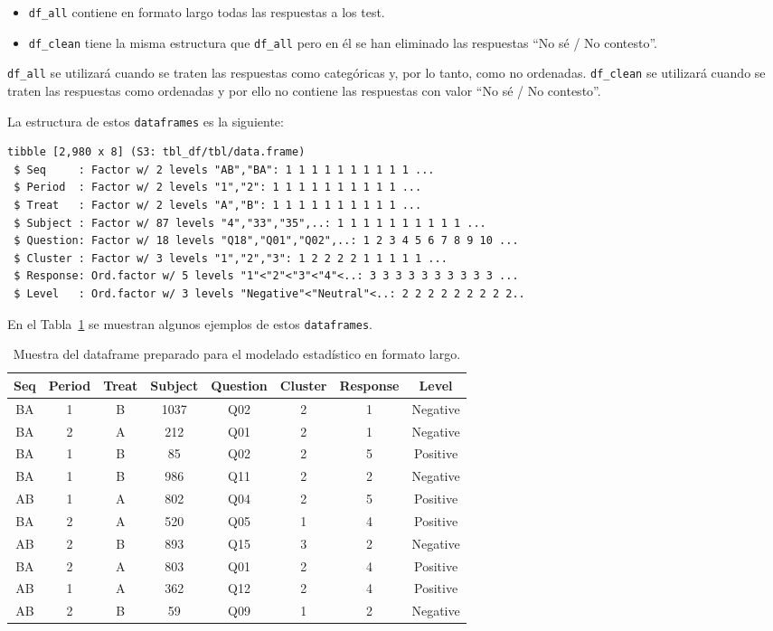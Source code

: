 \documentclass[
  12pt,
  a4paper,
  extrafontsizes,
  onecolumn,
  openright]{memoir}
\providecommand{\tightlist}{%
  \setlength{\itemsep}{0pt}\setlength{\parskip}{0pt}}\usepackage{longtable,booktabs,array}
\begin{document}
\begin{itemize}
\tightlist
\item
  \texttt{df\_all} contiene en formato largo todas las respuestas a los
  test.
\item
  \texttt{df\_clean} tiene la misma estructura que \texttt{df\_all} pero
  en él se han eliminado las respuestas \enquote{No sé / No contesto}.
\end{itemize}

\texttt{df\_all} se utilizará cuando se traten las respuestas como
categóricas y, por lo tanto, como no ordenadas. \texttt{df\_clean} se
utilizará cuando se traten las respuestas como ordenadas y por ello no
contiene las respuestas con valor \enquote{No sé / No contesto}.

La estructura de estos \texttt{dataframes} es la siguiente:

\begin{verbatim}
tibble [2,980 x 8] (S3: tbl_df/tbl/data.frame)
 $ Seq     : Factor w/ 2 levels "AB","BA": 1 1 1 1 1 1 1 1 1 1 ...
 $ Period  : Factor w/ 2 levels "1","2": 1 1 1 1 1 1 1 1 1 1 ...
 $ Treat   : Factor w/ 2 levels "A","B": 1 1 1 1 1 1 1 1 1 1 ...
 $ Subject : Factor w/ 87 levels "4","33","35",..: 1 1 1 1 1 1 1 1 1 1 ...
 $ Question: Factor w/ 18 levels "Q18","Q01","Q02",..: 1 2 3 4 5 6 7 8 9 10 ...
 $ Cluster : Factor w/ 3 levels "1","2","3": 1 2 2 2 2 1 1 1 1 1 ...
 $ Response: Ord.factor w/ 5 levels "1"<"2"<"3"<"4"<..: 3 3 3 3 3 3 3 3 3 3 ...
 $ Level   : Ord.factor w/ 3 levels "Negative"<"Neutral"<..: 2 2 2 2 2 2 2 2 2..
\end{verbatim}

En el Tabla~\ref{tbl-df_clean} se muestran algunos ejemplos de estos
\texttt{dataframes}.

\hypertarget{tbl-df_clean}{}
\begin{longtable}{cccccccc}
\caption{\label{tbl-df_clean}Muestra del dataframe preparado para el modelado estadístico en formato
largo. }\tabularnewline

\toprule
Seq & Period & Treat & Subject & Question & Cluster & Response & Level \\ 
\midrule
BA & 1 & B & 1037 & Q02 & 2 & 1 & Negative \\ 
BA & 2 & A & 212 & Q01 & 2 & 1 & Negative \\ 
BA & 1 & B & 85 & Q02 & 2 & 5 & Positive \\ 
BA & 1 & B & 986 & Q11 & 2 & 2 & Negative \\ 
AB & 1 & A & 802 & Q04 & 2 & 5 & Positive \\ 
BA & 2 & A & 520 & Q05 & 1 & 4 & Positive \\ 
AB & 2 & B & 893 & Q15 & 3 & 2 & Negative \\ 
BA & 2 & A & 803 & Q01 & 2 & 4 & Positive \\ 
AB & 1 & A & 362 & Q12 & 2 & 4 & Positive \\ 
AB & 2 & B & 59 & Q09 & 1 & 2 & Negative \\ 
\bottomrule
\end{longtable}
\end{document}
